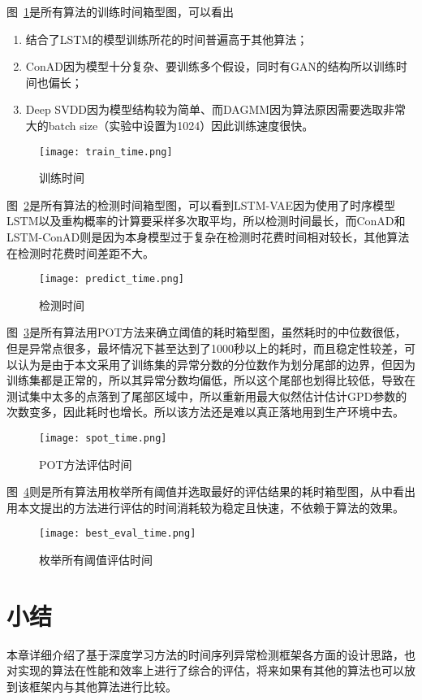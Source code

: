 图~\ref{fig:train:time}是所有算法的训练时间箱型图，可以看出
\begin{enumerate}
  \item 结合了LSTM的模型训练所花的时间普遍高于其他算法；
  \item ConAD因为模型十分复杂、要训练多个假设，同时有GAN的结构所以训练时间也偏长；
  \item Deep SVDD因为模型结构较为简单、而DAGMM因为算法原因需要选取非常大的batch size（实验中设置为1024）因此训练速度很快。
\end{enumerate}

\begin{figure}[htbp]
  \centering
  \texttt{[image: train\_time.png]}
  \caption{训练时间}
  \label{fig:train:time}
\end{figure}

图~\ref{fig:test:time}是所有算法的检测时间箱型图，可以看到LSTM-VAE因为使用了时序模型LSTM以及重构概率的计算要采样多次取平均，所以检测时间最长，而ConAD和LSTM-ConAD则是因为本身模型过于复杂在检测时花费时间相对较长，其他算法在检测时花费时间差距不大。

\begin{figure}[htbp]
  \centering
  \texttt{[image: predict\_time.png]}
  \caption{检测时间}
  \label{fig:test:time}
\end{figure}

图~\ref{fig:pot:time}是所有算法用POT方法来确立阈值的耗时箱型图，虽然耗时的中位数很低，但是异常点很多，最坏情况下甚至达到了1000秒以上的耗时，而且稳定性较差，可以认为是由于本文采用了训练集的异常分数的分位数作为划分尾部的边界，但因为训练集都是正常的，所以其异常分数均偏低，所以这个尾部也划得比较低，导致在测试集中太多的点落到了尾部区域中，所以重新用最大似然估计估计GPD参数的次数变多，因此耗时也增长。所以该方法还是难以真正落地用到生产环境中去。

\begin{figure}[htbp]
  \centering
  \texttt{[image: spot\_time.png]}
  \caption{POT方法评估时间}
  \label{fig:pot:time}
\end{figure}

图~\ref{fig:eval:time}则是所有算法用枚举所有阈值并选取最好的评估结果的耗时箱型图，从中看出用本文提出的方法进行评估的时间消耗较为稳定且快速，不依赖于算法的效果。

\begin{figure}[htbp]
  \centering
  \texttt{[image: best\_eval\_time.png]}
  \caption{枚举所有阈值评估时间}
  \label{fig:eval:time}
\end{figure}

\section{小结}
本章详细介绍了基于深度学习方法的时间序列异常检测框架各方面的设计思路，也对实现的算法在性能和效率上进行了综合的评估，将来如果有其他的算法也可以放到该框架内与其他算法进行比较。


